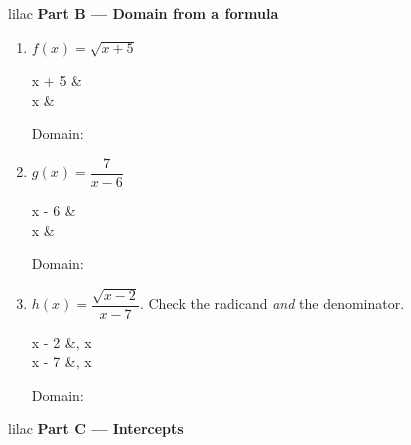 \documentclass[10pt]{article}
\begin{document}
\vspace{0.16in}

\begin{headlinebox}{lilac}
\textbf{\color{plum}Part B --- Domain from a formula}
\end{headlinebox}

\begin{enumerate}[leftmargin=1.9em, itemsep=9pt, start=3]

\item $f(x) = \sqrt{x + 5}$

\begin{work}
  x + 5 & \\
      x &
\end{work}

      Domain: \blank{3.2cm}

\item $g(x) = \dfrac{7}{x - 6}$

\begin{work}
  x - 6 & \\
      x &
\end{work}

      Domain: \blank{3.6cm}

\item $h(x) = \dfrac{\sqrt{x - 2}}{x - 7}$. Check the radicand \emph{and} the denominator.

\begin{work}
   x - 2 &, \quad{} x  \\
   x - 7 &, \quad{} x 
\end{work}

      Domain: \blank{3.6cm}

\end{enumerate}

\newpage

\begin{headlinebox}{lilac}
\textbf{\color{plum}Part C --- Intercepts}
\end{headlinebox}
\end{document}
